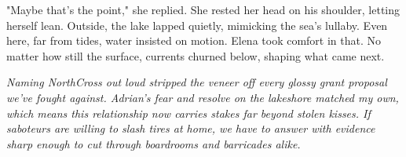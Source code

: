 "Maybe that's the point," she replied. She rested her head on his shoulder, letting herself lean. Outside, the lake lapped quietly, mimicking the sea's lullaby. Even here, far from tides, water insisted on motion. Elena took comfort in that. No matter how still the surface, currents churned below, shaping what came next.


\noindent\textit{Naming NorthCross out loud stripped the veneer off every glossy grant proposal we've fought against. Adrian's fear and resolve on the lakeshore matched my own, which means this relationship now carries stakes far beyond stolen kisses. If saboteurs are willing to slash tires at home, we have to answer with evidence sharp enough to cut through boardrooms and barricades alike.}
